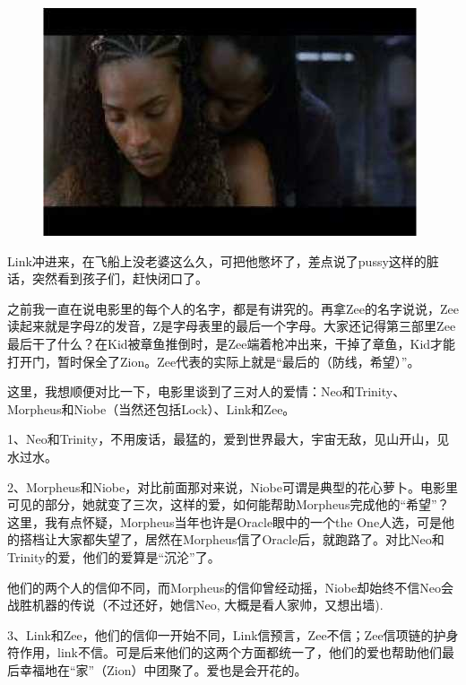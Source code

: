 \documentclass{ctexart}
\begin{document}
\begin{figure}[htb]
\centering
\includegraphics[width=0.5\linewidth]{fig/read_reloaded-39}
\end{figure}

Link冲进来，在飞船上没老婆这么久，可把他憋坏了，差点说了pussy这样的脏话，突然看到孩子们，赶快闭口了。

之前我一直在说电影里的每个人的名字，都是有讲究的。再拿Zee的名字说说，Zee读起来就是字母Z的发音，Z是字母表里的最后一个字母。大家还记得第三部里Zee最后干了什么？在Kid被章鱼推倒时，是Zee端着枪冲出来，干掉了章鱼，Kid才能打开门，暂时保全了Zion。Zee代表的实际上就是“最后的（防线，希望）”。

这里，我想顺便对比一下，电影里谈到了三对人的爱情：Neo和Trinity、Morpheus和Niobe（当然还包括Lock）、Link和Zee。

1、Neo和Trinity，不用废话，最猛的，爱到世界最大，宇宙无敌，见山开山，见水过水。

2、Morpheus和Niobe，对比前面那对来说，Niobe可谓是典型的花心萝卜。电影里可见的部分，她就变了三次，这样的爱，如何能帮助Morpheus完成他的“希望”？这里，我有点怀疑，Morpheus当年也许是Oracle眼中的一个the One人选，可是他的搭档让大家都失望了，居然在Morpheus信了Oracle后，就跑路了。对比Neo和Trinity的爱，他们的爱算是“沉沦”了。

他们的两个人的信仰不同，而Morpheus的信仰曾经动摇，Niobe却始终不信Neo会战胜机器的传说（不过还好，她信Neo, 大概是看人家帅，又想出墙).

3、Link和Zee，他们的信仰一开始不同，Link信预言，Zee不信；Zee信项链的护身符作用，link不信。可是后来他们的这两个方面都统一了，他们的爱也帮助他们最后幸福地在“家”（Zion）中团聚了。爱也是会开花的。
\end{document}

